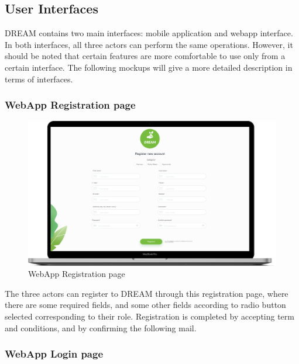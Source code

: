 \subsection{User Interfaces}
DREAM contains two main interfaces: mobile application and webapp interface.
In both interfaces, all three actors can perform the same operations.
However, it should be noted that certain features are more comfortable to use only from a certain interface.
The following mockups will give a more detailed description in terms of interfaces.


\subsubsection{WebApp Registration page}

\begin{figure}[H]
   \centering
  \includegraphics[width=140mm,scale=0.9]{./Images//Mocks/WebApp/Registration.png}
  \caption{WebApp Registration page}
\end{figure}

The three actors can register to DREAM through this registration page, where there are some required fields, and some other fields according to radio button selected corresponding to their role. Registration is completed by accepting term and conditions, and by confirming the following mail.

\subsubsection{WebApp Login page}

